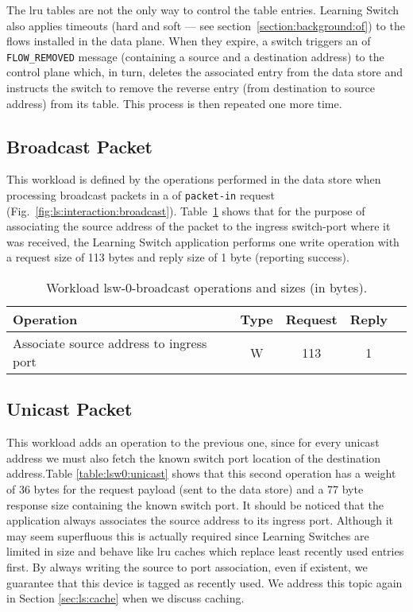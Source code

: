 The \gls{lru} tables are not the only way to control the table entries. Learning Switch also applies timeouts (hard and soft --- see section~\ref{section:background:of})  to the flows installed in the data plane. When they expire, a switch triggers an \gls{of} \texttt{FLOW\_REMOVED} message (containing a source and a destination address) to the control plane which, in turn, deletes the associated entry from the data store and instructs the switch to remove the reverse entry (from destination to source address) from its table. This process is then repeated one more time.

\subsection{Broadcast Packet}
This workload is defined by  the operations performed in the data store when processing broadcast packets in a \acrfull{of} \texttt{packet-in} request (Fig.~\ref{fig:ls:interaction:broadcast}). Table~\ref{table:lsw0:broadcast} shows that for the purpose of associating the source address of the packet to the ingress switch-port where it was received, the Learning Switch application performs one write operation with a request size of 113 bytes and reply size of 1 byte (reporting success). 

\begin{table}[ht]
\small
\centering 
\begin{tabular}{l c c c c}
 Operation & Type & Request & Reply \\ \toprule 
 Associate source address to ingress port & W & 113 & 1 \\ 
\end{tabular}
\caption[Workload lsw-0-broadcast operations]{Workload lsw-0-broadcast operations and sizes (in bytes).}
\label{table:lsw0:broadcast}
\end{table}

\subsection{Unicast Packet}
This workload adds an operation to the previous one, since for every unicast address we must also fetch the known switch port location of the destination address.Table \ref{table:lsw0:unicast} shows that this second operation has a weight of 36 bytes for the request payload (sent to the data store) and a 77 byte response size containing the known switch port.  
It should be noticed that the application always associates the source address to its ingress port. Although it may seem superfluous this is actually required since Learning Switches are limited in size and behave like \gls{lru} caches which replace least recently used entries first. By always writing the source to port association, even if existent, we guarantee that this device is tagged as recently used. We address 
this topic again in Section \ref{sec:ls:cache} when we discuss caching. 

